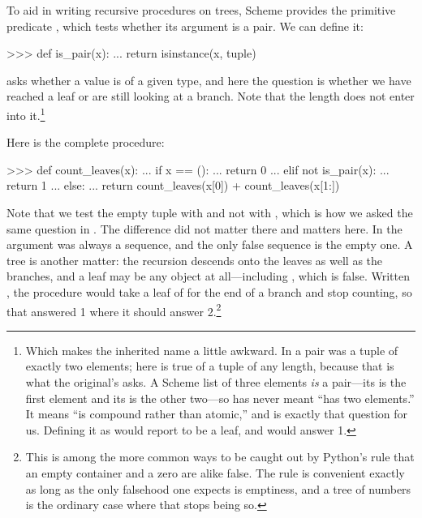 \noindent
To aid in writing recursive procedures on trees, Scheme provides the primitive
predicate , which tests whether its argument is a pair.  We can
define it:

\begin{codeBlock}
>>> def is_pair(x):
...     return isinstance(x, tuple)
\end{codeBlock}

\noindent
{} asks whether a value is of a given type, and here the
question is whether we have reached a leaf or are still looking at a branch.
Note that the length does not enter into it.\footnote{Which makes the inherited
name a little awkward.  In  a pair was a tuple of exactly two
elements;  here is true of a tuple of any length, because that
is what the original's  asks.  A Scheme list of three elements
\emph{is} a pair---its  is the first element and its  is
the other two---so  has never meant ``has two elements.''  It means
``is compound rather than atomic,'' and  is exactly
that question for us.  Defining it as  would report
 to be a leaf, and  would answer 1.}

Here is the complete procedure:

\begin{codeBlock}
>>> def count_leaves(x):
...     if x == ():
...         return 0
...     elif not is_pair(x):
...         return 1
...     else:
...         return count_leaves(x[0]) + count_leaves(x[1:])
\end{codeBlock}

\noindent
Note that we test the empty tuple with  and not with , which is how we asked the same question in .  The
difference did not matter there and matters here.  In  the
argument was always a sequence, and the only false sequence is the empty one.
A tree is another matter: the recursion descends onto the leaves as well as the
branches, and a leaf may be any object at all---including , which is
false.  Written , the procedure would take a leaf of  for
the end of a branch and stop counting, so that 
answered 1 where it should answer 2.\footnote{This is among the more common
ways to be caught out by Python's rule that an empty container and a zero are
alike false.  The rule is convenient exactly as long as the only falsehood one
expects is emptiness, and a tree of numbers is the ordinary case where that
stops being so.}

